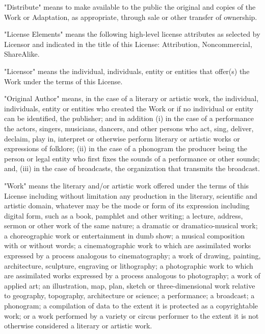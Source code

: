 \item
    "Distribute" means to make available to the public the original and
    copies of the Work or Adaptation, as appropriate, through sale or
    other transfer of ownership.

\item
    "License Elements" means the following high-level license attributes
    as selected by Licensor and indicated in the title of this License:
    Attribution, Noncommercial, ShareAlike.

\item
    "Licensor" means the individual, individuals, entity or entities that
    offer(s) the Work under the terms of this License.

\item
    "Original Author" means, in the case of a literary or artistic work,
    the individual, individuals, entity or entities who created the Work
    or if no individual or entity can be identified, the publisher; and in
    addition (i) in the case of a performance the actors, singers,
    musicians, dancers, and other persons who act, sing, deliver, declaim,
    play in, interpret or otherwise perform literary or artistic works or
    expressions of folklore; (ii) in the case of a phonogram the producer
    being the person or legal entity who first fixes the sounds of a
    performance or other sounds; and, (iii) in the case of broadcasts, the
    organization that transmits the broadcast.

\item
    "Work" means the literary and/or artistic work offered under the terms
    of this License including without limitation any production in the
    literary, scientific and artistic domain, whatever may be the mode or
    form of its expression including digital form, such as a book,
    pamphlet and other writing; a lecture, address, sermon or other work
    of the same nature; a dramatic or dramatico-musical work; a
    choreographic work or entertainment in dumb show; a musical
    composition with or without words; a cinematographic work to which are
    assimilated works expressed by a process analogous to cinematography;
    a work of drawing, painting, architecture, sculpture, engraving or
    lithography; a photographic work to which are assimilated works
    expressed by a process analogous to photography; a work of applied
    art; an illustration, map, plan, sketch or three-dimensional work
    relative to geography, topography, architecture or science; a
    performance; a broadcast; a phonogram; a compilation of data to the
    extent it is protected as a copyrightable work; or a work performed by
    a variety or circus performer to the extent it is not otherwise
    considered a literary or artistic work.

